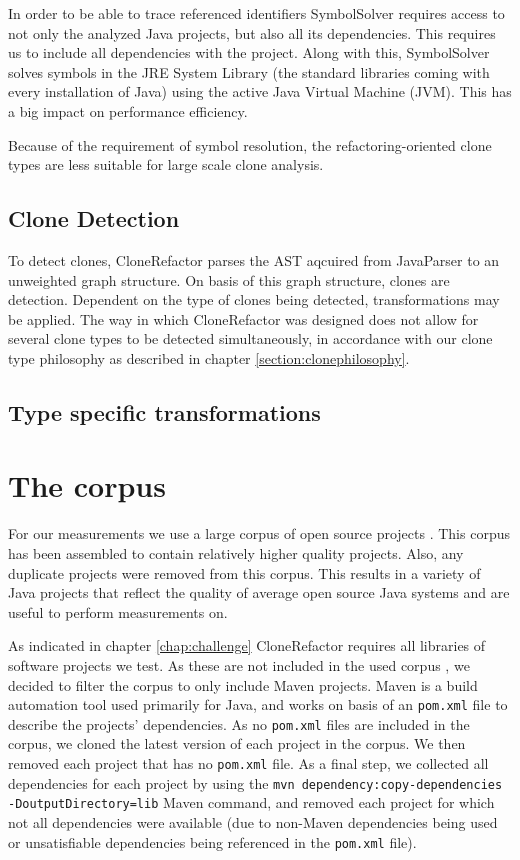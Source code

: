 In order to be able to trace referenced identifiers SymbolSolver requires access to not only the analyzed Java projects, but also all its dependencies. This requires us to include all dependencies with the project. Along with this, SymbolSolver solves symbols in the JRE System Library (the standard libraries coming with every installation of Java) using the active Java Virtual Machine (JVM). This has a big impact on performance efficiency.

Because of the requirement of symbol resolution, the refactoring-oriented clone types are less suitable for large scale clone analysis.

\subsection{Clone Detection}
To detect clones, CloneRefactor parses the AST aqcuired from JavaParser to an unweighted graph structure. On basis of this graph structure, clones are detection. Dependent on the type of clones being detected, transformations may be applied. The way in which CloneRefactor was designed does not allow for several clone types to be detected simultaneously, in accordance with our clone type philosophy as described in chapter \ref{section:clonephilosophy}.

\subsection{Type specific transformations}

\section{The corpus}\label{chap:corpus}
For our measurements we use a large corpus of open source projects \cite{githubCorpus2013}. This corpus has been assembled to contain relatively higher quality projects. Also, any duplicate projects were removed from this corpus. This results in a variety of Java projects that reflect the quality of average open source Java systems and are useful to perform measurements on.

As indicated in chapter \ref{chap:challenge} CloneRefactor requires all libraries of software projects we test. As these are not included in the used corpus \cite{githubCorpus2013}, we decided to filter the corpus to only include Maven projects. Maven is a build automation tool used primarily for Java, and works on basis of an \texttt{pom.xml} file to describe the projects' dependencies. As no \texttt{pom.xml} files are included in the corpus, we cloned the latest version of each project in the corpus. We then removed each project that has no \texttt{pom.xml} file. As a final step, we collected all dependencies for each project by using the \texttt{mvn dependency:copy-dependencies -DoutputDirectory=lib} Maven command, and removed each project for which not all dependencies were available (due to non-Maven dependencies being used or unsatisfiable dependencies being referenced in the \texttt{pom.xml} file).

